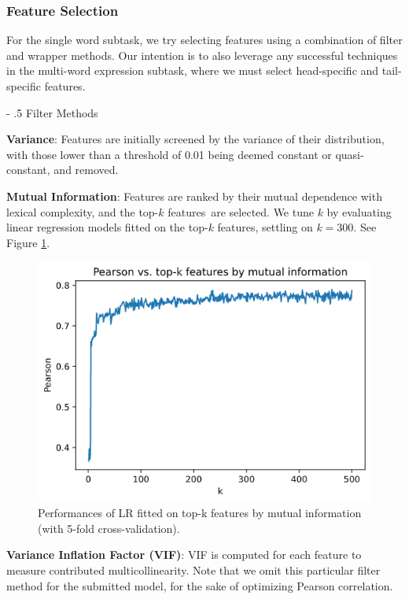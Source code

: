 \documentclass[11pt,a4paper]{article}
\makeatletter
\renewcommand\paragraph{%
    \@startsection{paragraph}{4}{0mm}%
        {-\baselineskip}%
        {.5\baselineskip}%
        {\normalfont\normalsize\bfseries}}
\makeatother
\begin{document}
\subsubsection{Feature Selection}

For the single word subtask, we try selecting features using a combination of filter and wrapper methods. Our intention is to also leverage any successful techniques in the multi-word expression subtask, where we must select head-specific and tail-specific features.

\paragraph{Filter Methods}

\textbf{Variance}: Features are initially screened by the variance of their distribution, with those lower than a threshold of 0.01 being deemed constant or quasi-constant, and removed. 

\textbf{Mutual Information}: Features are ranked by their mutual dependence with lexical complexity, and the top-$k$ features are selected. We tune $k$ by evaluating linear regression models fitted on the top-$k$ features, settling on $k=300$. See Figure \ref{fig:mi}.

\begin{figure}
  \centering
  \includegraphics[scale=0.4]{mi.png}
  \caption{Performances of LR fitted on top-k features by mutual information (with 5-fold cross-validation).}
  \label{fig:mi}
\end{figure}

\textbf{Variance Inflation Factor (VIF)}: VIF is computed for each feature to measure contributed multicollinearity. Note that we omit this particular filter method for the submitted model, for the sake of optimizing Pearson correlation.
\end{document}
